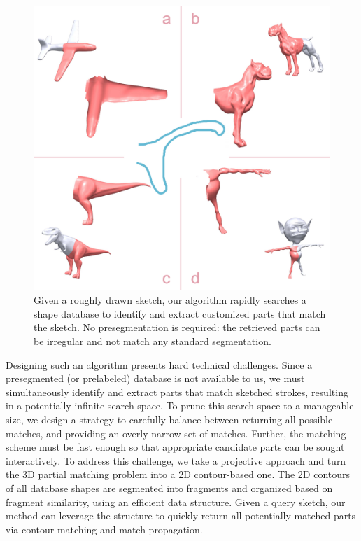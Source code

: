 \begin{figure}[h!]
\centering
\includegraphics[width=0.8\linewidth]{./Material/TeaserSGP.pdf}
\caption{Given a roughly drawn sketch, our algorithm rapidly searches a shape database to identify and extract customized parts that match the sketch. No presegmentation is required: the retrieved parts can be irregular and not match any standard segmentation.}
\label{fig:HeadPic}
\end{figure}

Designing such an algorithm presents hard technical challenges. Since a presegmented (or prelabeled) database is not available to us, we must simultaneously identify and extract parts that match sketched strokes, resulting in a potentially infinite search space. To prune this search space to a manageable size, we design a strategy to carefully balance between returning all possible matches, and providing an overly narrow set of matches. Further, the matching scheme must be fast enough so that appropriate candidate parts can be sought interactively. To address this challenge, we take a projective approach and turn the 3D partial matching problem into a 2D contour-based one. The 2D contours of all database shapes are segmented into fragments and organized based on fragment similarity, using an efficient data structure. Given a query sketch, our method can leverage the structure to quickly return all potentially matched parts via contour matching and match propagation.

